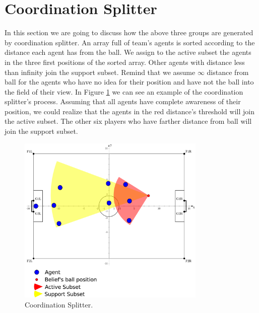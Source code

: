 \section{Coordination Splitter}
In this section we are going to discuss how the above three groups are generated by coordination splitter. An array full of team's agents is sorted according to the distance each agent has from the ball. We assign to the active subset the agents in the three first positions of the sorted array.
Other agents with distance less than infinity join the support subset.
Remind that we assume $\infty$ distance from ball for the agents who have no idea for their position and have not the ball into the field of their view.
In Figure \ref{fig:Splitter} we can see an example of the coordination splitter's process. Assuming that all agents have complete awareness of their position, we could realize that the agents in the red distance's threshold will join the active subset. The other six players who have farther distance from ball will join the support subset.
\begin{figure}[htb!]
\centering
  \includegraphics[width=0.8\textwidth]{Chapter4/figures/Splitter.pdf}
  \caption{Coordination Splitter.} 
  \label{fig:Splitter}
\end{figure}

